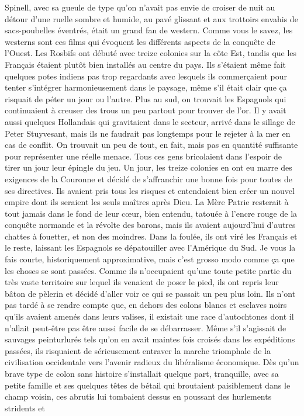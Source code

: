 
Spinell, avec sa gueule de type qu’on n’avait pas envie de croiser de nuit au détour d’une ruelle sombre et humide, au pavé glissant et aux trottoirs envahis de sacs-poubelles éventrés, était un grand fan de western. Comme vous le savez, les westerns sont ces films qui évoquent les différents aspects de la conquête de l’Ouest. Les Rosbifs ont débuté avec treize colonies sur la côte Est, tandis que les Français étaient plutôt bien installés au centre du pays. Ils s’étaient même fait quelques potes indiens pas trop regardants avec lesquels ils commerçaient pour tenter s’intégrer harmonieusement dans le paysage, même s’il était clair que ça risquait de péter un jour ou l’autre. Plus au sud, on trouvait les Espagnols qui continuaient à creuser des trous un peu partout pour trouver de l’or. Il y avait aussi quelques Hollandais qui gravitaient dans le secteur, arrivé dans le sillage de Peter Stuyvesant, mais ils ne faudrait pas longtemps pour le rejeter à la mer en cas de conflit. On trouvait un peu de tout, en fait, mais pas en quantité suffisante pour représenter une réelle menace. Tous ces gens bricolaient dans l’espoir de tirer un jour leur épingle du jeu. Un jour, les treize colonies en ont eu marre des exigences de la Couronne et décidé de s’affranchir une bonne fois pour toutes de ses directives. Ils avaient pris tous les risques et entendaient bien créer un nouvel empire dont ils seraient les seuls maîtres après Dieu. La Mère Patrie resterait à tout jamais dans le fond de leur cœur, bien entendu, tatouée à l’encre rouge de la conquête normande et la révolte des barons, mais ils avaient aujourd’hui d’autres chattes à fouetter, et non des moindres. Dans la foulée, ils ont viré les Français et le reste, laissant les Espagnols se dépatouiller avec l’Amérique du Sud. Je vous la fais courte, historiquement approximative, mais c’est grosso modo comme ça que les choses se sont passées. Comme ils n’occupaient qu’une toute petite partie du très vaste territoire sur lequel ils venaient de poser le pied, ils ont repris leur bâton de pèlerin et décidé d’aller voir ce qui se passait un peu plus loin. Ils n’ont pas tardé à se rendre compte que, en dehors des colons blancs et esclaves noirs qu’ils avaient amenés dans leurs valises, il existait une race d’autochtones dont il n’allait peut-être pas être aussi facile de se débarrasser. Même s’il s’agissait de sauvages peinturlurés tels qu’on en avait maintes fois croisés dans les expéditions passées, ils risquaient de sérieusement entraver la marche triomphale de la civilisation occidentale vers l’avenir radieux du libéralisme économique. Dès qu’un brave type de colon sans histoire s’installait quelque part, tranquille, avec sa petite famille et ses quelques têtes de bétail qui broutaient paisiblement dans le champ voisin, ces abrutis lui tombaient dessus en poussant des hurlements stridents et 